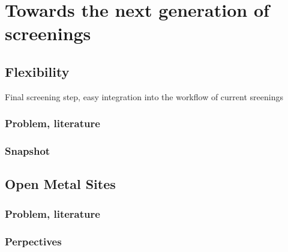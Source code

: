 \documentclass[thesis]{subfiles}
\begin{document}
\chapter{Towards the next generation of screenings}
\vspace*{-1\baselineskip}
\section{Flexibility}
Final screening step, easy integration into the workflow of current sreenings
\subsection{Problem, literature}

\subsection{Snapshot}

\section{Open Metal Sites}

\subsection{Problem, literature}

\subsection{Perpectives}

\OnlyInSubfile{\printglobalbibliography}
\end{document}
